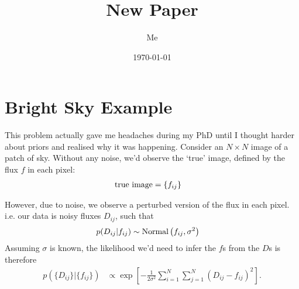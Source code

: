 \documentclass[a4paper, 11pt]{article}
\title{New Paper}
\author{Me}
\date{\today}
\begin{document}


\setlength{\parindent}{0pt}
\setlength{\parskip}{8pt}

\section{Bright Sky Example}
This problem actually gave me headaches during my PhD until
I thought harder about priors and realised why it was happening.
Consider an $N \times N$ image of a patch of sky. Without any noise,
we'd observe the `true' image, defined by the flux $f$ in each pixel:
\begin{align}
\textnormal{true image} &= \left\{f_{ij}\right\}
\end{align}

However, due to noise, we observe a perturbed version of the
flux in each pixel. i.e. our data is noisy fluxes $D_{ij}$,
such that
\begin{align}
p(D_{ij} | f_{ij}) &\sim \textnormal{Normal}\left(f_{ij}, \sigma^2\right)
\end{align}
Assuming $\sigma$ is known, the likelihood
we'd need to infer the $f$s from the $D$s
is therefore
\begin{align}
p\left(\{D_{ij}\} | \{f_{ij}\}\right)
&\propto \exp
\left[
  -\frac{1}{2\sigma^2}\sum_{i=1}^N\sum_{j=1}^N
                  \left(D_{ij} - f_{ij}\right)^2
\right].
\end{align}





{}
\end{document}
